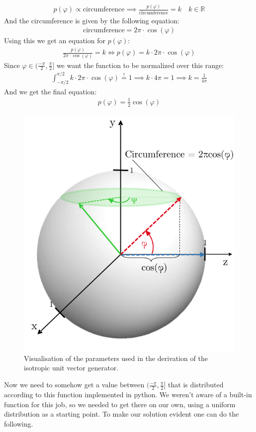 \documentclass[12pt,a4paper,oneside,english]{article}
\begin{document}
\begin{align}
p(\varphi) \propto \text{circumference} \implies \frac{p(\varphi)}{\text{circumference}} = k \quad  k \in \mathbb{R}
\end{align}
And the circumference is given by the following equation:
\begin{align}
\text{circumference} = 2  \pi \cdot \cos(\varphi)
\end{align}
Using this we get an equation for $p(\varphi)$:
\begin{align}
\frac{p(\varphi)}{2\pi\cdot \cos(\varphi)} = k \Longleftrightarrow p(\varphi) = k \cdot 2\pi \cdot \cos(\varphi)
\end{align}
Since $\varphi \in (\frac{-\pi}{2}, \frac{\pi}{2}]$ we want the function to be normalized over this range:
\begin{align}
\int_{-\pi/2}^{\pi/2}k\cdot 2\pi \cdot \cos(\varphi) \overset{!}{=} 1 \implies k \cdot 4\pi  = 1 \implies k = \frac{1}{4\pi}
\end{align}
And we get the final equation:
\begin{align}
p(\varphi) = \frac{1}{2}\cos(\varphi)
\end{align}
\begin{figure}[H]
	\centering
	\includegraphics[width=0.6\linewidth]{images/Kugelbild_bea.pdf}
	\caption{Visualisation of the parameters used in the derivation of the isotropic unit vector generator.}
	\label{fig:Kugelbild}
\end{figure}
Now we need to somehow get a value between $(\frac{-\pi}{2}, \frac{\pi}{2}]$ that is distributed according to this function implemented in python. We weren’t aware of a built-in function for this job, so we needed to get there on our own, using a uniform distribution as a starting point. To make our solution evident one can do the following.
\end{document}
